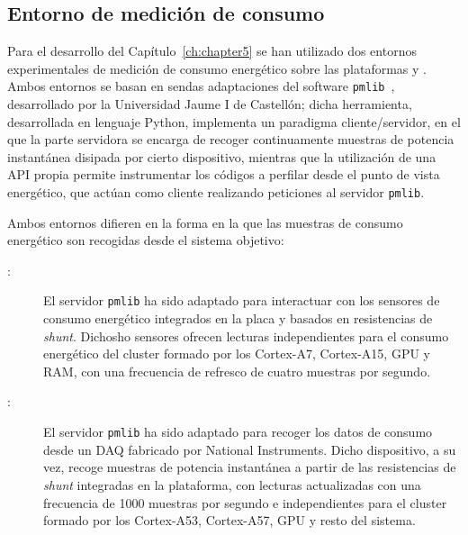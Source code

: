 
\subsection{Entorno de medición de consumo}

Para el desarrollo del Capítulo~\ref{ch:chapter5} se han utilizado dos entornos experimentales de medición de consumo
energético sobre las plataformas \odroid y \juno. Ambos entornos se basan en sendas adaptaciones del software {\tt pmlib}~\cite{AlonsoICPP12},
desarrollado por la Universidad Jaume I de Castellón; dicha herramienta, desarrollada en lenguaje Python, implementa un paradigma
 cliente/servidor, en el que la parte servidora se encarga de recoger continuamente muestras de potencia instantánea disipada
por cierto dispositivo, mientras que la utilización de una API propia permite instrumentar los códigos a perfilar desde el
punto de vista energético, que actúan como cliente realizando peticiones al servidor {\tt pmlib}.

Ambos entornos difieren en la forma en la que las muestras de consumo energético son recogidas desde el sistema objetivo:

\begin{description}

\item[\odroid:] El servidor {\tt pmlib} ha sido adaptado para interactuar con los sensores de consumo energético integrados 
  en la placa y basados en resistencias de {\em shunt}. Dichosho sensores ofrecen lecturas independientes para el consumo energético
del cluster formado por los Cortex-A7, Cortex-A15, GPU y RAM, con una frecuencia de refresco de cuatro muestras por segundo.

\item[\juno:] El servidor {\tt pmlib} ha sido adaptado para recoger los datos de consumo desde un DAQ fabricado por National
Instruments. Dicho dispositivo, a su vez, recoge muestras de potencia instantánea a partir de las resistencias de {\em shunt}
integradas en la plataforma, con lecturas actualizadas con una frecuencia de 1000 muestras por segundo e independientes para el cluster formado por los 
Cortex-A53, Cortex-A57, GPU y resto del sistema.

\end{description}

